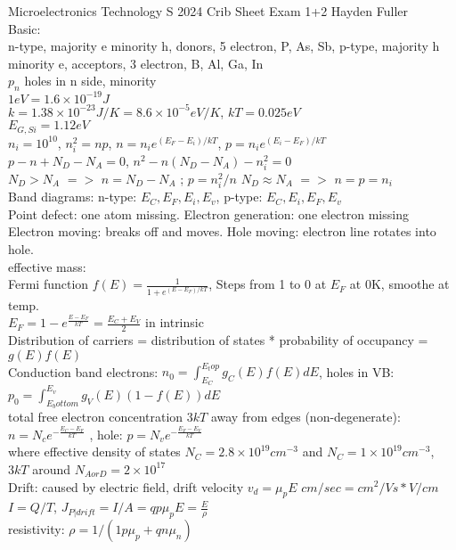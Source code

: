 \documentclass{article}
\begin{document}
Microelectronics Technology S 2024 Crib Sheet Exam 1+2 Hayden Fuller
\\Basic:
\\n-type, majority e minority h, donors, 5 electron, P, As, Sb,    p-type, majority h minority e, acceptors, 3 electron, B, Al, Ga, In
\\$p_n$ holes in n side, minority
\\$1eV=1.6\times10^{-19}J$
\\$k=1.38\times10^{-23}J/K=8.6\times10^{-5}eV/K$, $kT=0.025eV$
\\$E_{G,Si}=1.12eV$
\\$n_i=10^{10}$, $n_i^2=np$, $n=n_ie^{(E_F-E_i)/kT}$, $p=n_ie^{(E_i-E_F)/kT}$
\\$p-n+N_D-N_A=0$, $n^2-n(N_D-N_A)-n_i^2=0$
\\$N_D>N_A$ $= >$ $n=N_D-N_A$ ; $p=n_i^2/n$     $N_D\approx N_A$ $= >$ $n=p=n_i$
\\Band diagrams: n-type: $E_C, E_F, E_i, E_v$,   p-type: $E_C, E_i, E_F, E_v$
\\Point defect: one atom missing. Electron generation: one electron missing
\\Electron moving: breaks off and moves. Hole moving: electron line rotates into hole.
\\effective mass: 
\\Fermi function $f(E)=\frac{1}{1+e^{(E-E_F)/kT}}$, Steps from 1 to 0 at $E_F$ at 0K, smoothe at temp.
\\$E_F=1-e^{\frac{E-E_F}{kT}}=\frac{E_C+E_V}{2}$ in intrinsic
\\Distribution of carriers = distribution of states * probability of occupancy = $g(E) f(E)$
\\Conduction band electrons: $n_0=\int_{E_C}^{E_top} g_C(E)f(E)dE$, holes in VB: $p_0=\int_{E_bottom}^{E_v} g_V(E)(1-f(E))dE$
\\total free electron concentration $3kT$ away from edges (non-degenerate): $n=N_ce^{-\frac{E_C-E_F}{kT}}$ , hole: $p=N_ve^{-\frac{E_F-E_V}{kT}}$
\\where effective density of states $N_ C=2.8\times10^{19}cm^{-3}$ and $N_ C=1\times10^{19}cm^{-3}$, $3kT$ around $N_{A or D}=2\times10^{17}$
\\Drift:  caused by electric field, drift velocity $v_d=\mu_p E$  $cm/sec=cm^2/Vs * V/cm$
\\$I=Q/T$, $J_{P|drift}=I/A=qp\mu_pE=\frac{E}{\rho}$
\\resistivity: $\rho=1/(1p\mu_p+qn\mu_n)$
\end{document}
